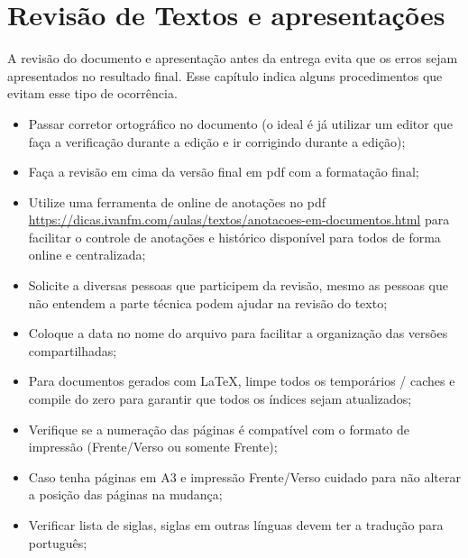 \chapter{Revisão de Textos e apresentações}
\label{revisao-de-textos}


A revisão do documento e apresentação antes da entrega evita que os erros sejam apresentados no resultado final. Esse capítulo indica alguns procedimentos que evitam esse tipo de ocorrência.

\begin{itemize}
    \item Passar corretor ortográfico no documento (o ideal é já utilizar um editor que faça a verificação durante a edição e ir corrigindo durante a edição);

    \item Faça a revisão em cima da versão final em \ac{pdf} com a formatação final;
    
    \item Utilize uma ferramenta de online de anotações no \ac{pdf} \url{https://dicas.ivanfm.com/aulas/textos/anotacoes-em-documentos.html} para facilitar o controle de anotações e histórico disponível para todos de forma online e centralizada;
    
    \item Solicite a diversas pessoas que participem da revisão, mesmo as pessoas que não entendem a parte técnica podem ajudar na revisão do texto;
    
    \item Coloque a data no nome do arquivo para facilitar a organização das versões compartilhadas;
    
    \item Para documentos gerados com \LaTeX, limpe todos os temporários / caches e compile do zero para garantir que todos os índices sejam atualizados;
    
    \item Verifique se a numeração das páginas é compatível com o formato de impressão (Frente/Verso ou somente Frente);
    
    \item Caso tenha páginas em A3 e impressão Frente/Verso cuidado para não alterar a posição das páginas na mudança;
    
    \item Verificar lista de siglas, siglas em outras línguas devem ter a tradução para português;


\end{itemize}
